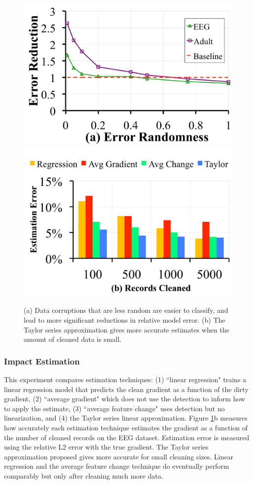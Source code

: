 \begin{figure}[ht!]
\centering
 \includegraphics[width=0.49\columnwidth]{exp/exp5a.pdf}
 \includegraphics[width=0.49\columnwidth]{exp/exp12.pdf}\vspace{-0.5em}
 \caption{(a) Data corruptions that are less random are easier to classify, and lead to more significant reductions in relative model error. (b) The Taylor series approximation gives more accurate estimates when the amount of cleaned data is small. \label{tradeoffs2}}
\end{figure}

\subsubsection{Impact Estimation}\label{est}
This experiment compares estimation techniques: (1) ``linear regression" trains a linear regression model that predicts the clean gradient as a function of the dirty gradient, (2) ``average gradient" which does not use the detection to inform how to apply the estimate, (3) ``average feature change" uses detection but no linearization, and (4) the Taylor series linear approximation.
Figure \ref{tradeoffs2}b measures how accurately each estimation technique estimates the gradient as a function of the number of cleaned records on the EEG dataset.
Estimation error is measured using the relative L2 error with the true gradient.
The Taylor series approximation proposed gives more accurate for small cleaning sizes.
Linear regression and the average feature change technique do eventually perform comparably but only after cleaning much more data.

